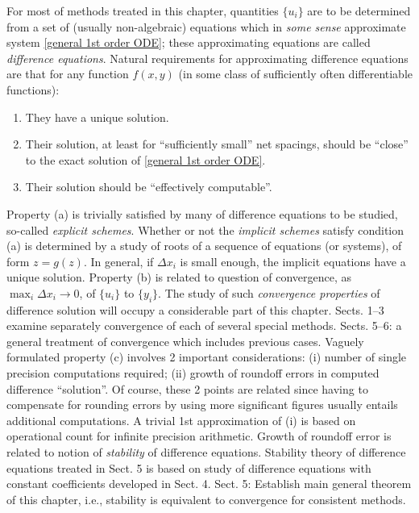 \documentclass{article}
\begin{document}
\begin{enumerate}
\begin{itemize}
\begin{itemize}
			For most of methods treated in this chapter, quantities $\{u_i\}$ are to be determined from a set of (usually non-algebraic) equations which in {\it some sense} approximate system \eqref{general 1st order ODE}; these approximating equations are called {\it difference equations}. Natural requirements for approximating difference equations are that for any function $f(x,y)$ (in some class of sufficiently often differentiable functions):
			\begin{enumerate}
				\item They have a unique solution.
				\item Their solution, at least for ``sufficiently small'' net spacings, should be ``close'' to the exact  solution of \eqref{general 1st order ODE}.
				\item Their solution should be ``effectively computable''.
			\end{enumerate}
			Property (a) is trivially satisfied by many of difference equations to be studied, so-called {\it explicit schemes}. Whether or not the {\it implicit schemes} satisfy condition (a) is determined by a study of roots of a sequence of equations (or systems), of form $z = g(z)$. In general, if $\Delta x_i$ is small enough, the implicit equations have a unique solution. Property (b) is related to question of convergence, as $\max_i \Delta x_i\to0$, of $\{u_i\}$ to $\{y_i\}$. The study of such {\it convergence properties} of difference solution will occupy a considerable part of this chapter. Sects. 1--3 examine separately convergence of each of several special methods. Sects. 5--6: a general treatment of convergence which includes previous cases. Vaguely formulated property (c) involves 2 important considerations: (i) number of single precision computations required; (ii) growth of roundoff errors in computed difference ``solution''. Of course, these 2 points are related since having to compensate for rounding errors by using more significant figures usually entails additional computations. A trivial 1st approximation of (i) is based on operational count for infinite precision arithmetic. Growth of roundoff error is related to notion of {\it stability} of difference equations. Stability theory of difference equations treated in Sect. 5 is based on study of difference equations with constant coefficients developed in Sect. 4. Sect. 5: Establish main general theorem of this chapter, i.e., stability is equivalent to convergence for consistent methods.
			

\end{itemize}
\end{itemize}
\end{enumerate}
\end{document}

